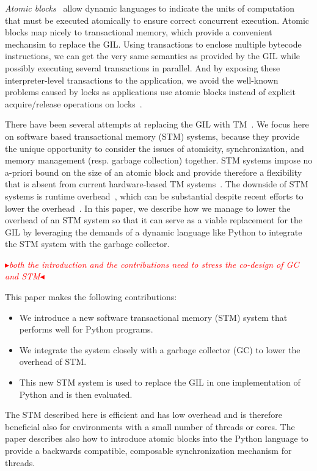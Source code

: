 \documentclass{sigplanconf}
\newcommand{\mynote}[2]{%
  \textcolor{red}{%
    \fbox{\bfseries\sffamily\scriptsize#1}%
    {\small$\blacktriangleright$\textsf{\emph{#2}}$\blacktriangleleft$}%
  }%
}
\newcommand\cfbolz[1]{\mynote{cfbolz}{#1}}
\begin{document}
\emph{Atomic
blocks}~\cite{tim03,tim05} allow dynamic languages to indicate
the units of computation that must be executed atomically to ensure correct concurrent
execution.  Atomic blocks map nicely to transactional memory, which provide a convenient
mechansim to replace the GIL.
 Using transactions to enclose
multiple bytecode instructions, we can get the very same semantics as
provided by the GIL while possibly executing several transactions in
parallel. And by exposing these interpreter-level
transactions to the application, we
avoid the well-known problems caused by locks as applications use atomic blocks instead
of explicit acquire/release operations on locks~\cite{christopher10,victor11,shan08}.

There have been several attempts at replacing the GIL with
TM~\cite{nicholas06,odaira14,fuad10}.  We focus here on software based
transactional memory (STM) systems,
because they provide the unique opportunity to consider the issues of atomicity,
synchronization, and memory management (resp. garbage collection) together.
STM systems impose no a-priori bound on the size of an atomic block and provide therefore
a flexibility that is absent from current hardware-based TM systems~\cite{wayforward14}.
The downside of STM systems is runtime overhead~\cite{cascaval08,drago11}, which can
be substantial despite recent efforts to lower the overhead~\cite{warmhoff13,spear09}.
In this paper, we describe how we manage to lower the overhead of an
STM system so that it can serve as a viable replacement for the GIL by leveraging the
demands of a dynamic language like Python to integrate the STM system with the garbage
collector.



\cfbolz{both the introduction and the contributions need to stress the co-design of GC and STM}

This paper makes the following contributions:
\begin{itemize}[noitemsep]
\item We introduce a new software transactional memory (STM) system
  that performs well for Python programs.
\item We integrate the  system closely with a garbage collector
  (GC) to lower the overhead of STM.
\item This new STM system is used to replace the GIL in one
  implementation of Python and is then evaluated.
\end{itemize}
The STM described here is efficient and has low overhead and is therefore beneficial also
for environments with a small number of threads or cores. The paper describes also
how to introduce atomic blocks into the Python language to provide a
  backwards compatible, composable synchronization mechanism for
  threads.
\end{document}
